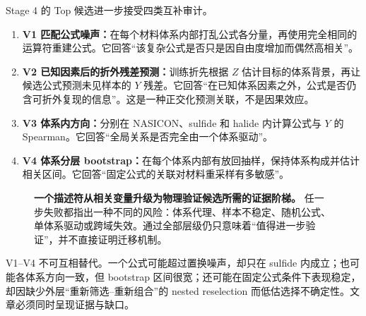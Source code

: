 Stage 4 的 Top 候选进一步接受四类互补审计。

\begin{enumerate}
  \item \textbf{V1 匹配公式噪声：}在每个材料体系内部打乱公式各分量，再使用完全相同的运算符重建公式。它回答“该复杂公式是否只是因自由度增加而偶然高相关”。
  \item \textbf{V2 已知因素后的折外残差预测：}训练折先根据 $Z$ 估计目标的体系背景，再让候选公式预测未见样本的 $Y$ 残差。它回答“在已知体系因素之外，公式是否仍含可折外复现的信息”。这是一种正交化预测关联，不是因果效应。
  \item \textbf{V3 体系内方向：}分别在 NASICON、sulfide 和 halide 内计算公式与 $Y$ 的 Spearman。它回答“全局关系是否完全由一个体系驱动”。
  \item \textbf{V4 体系分层 bootstrap：}在每个体系内部有放回抽样，保持体系构成并估计相关区间。它回答“固定公式的关联对材料重采样有多敏感”。
\end{enumerate}

\begin{figure}[htbp]
\centering
\resizebox{\textwidth}{!}{}
\caption{\textbf{一个描述符从相关变量升级为物理验证候选所需的证据阶梯。} 任一步失败都指出一种不同的风险：体系代理、样本不稳定、随机公式、单体系驱动或跨域失效。通过全部层级仍只意味着“值得进一步验证”，并不直接证明迁移机制。}
\label{fig:evidenceladder}
\end{figure}

V1--V4 不可互相替代。一个公式可能超过置换噪声，却只在 sulfide 内成立；也可能各体系方向一致，但 bootstrap 区间很宽；还可能在固定公式条件下表现稳定，却因缺少外层“重新筛选--重新组合”的 nested reselection 而低估选择不确定性。文章必须同时呈现证据与缺口。
